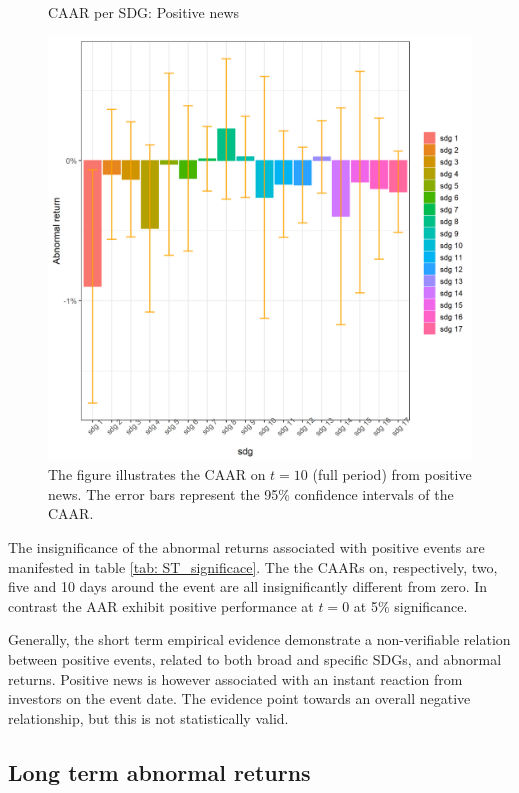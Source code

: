 \begin{figure} [H]
    \centering
    \caption{CAAR per SDG: Positive news}
    \includegraphics[scale=0.6]{Projekt/1.Figures analysis/ST_positive_sdg_bar.png}
    \caption*{\footnotesize The figure illustrates the CAAR on $t = 10$ (full period) from positive news. The error bars represent the 95\% confidence intervals of the CAAR.}
    \label{fig:ST_pos_bar}
\end{figure}

The insignificance of the abnormal returns associated with positive events are manifested in table \ref{tab: ST_significace}. The the CAARs on, respectively, two, five and 10 days around the event are all insignificantly different from zero. In contrast the AAR exhibit positive performance at $t = 0$ at 5\% significance. 

Generally, the short term empirical evidence demonstrate a non-verifiable relation between positive events, related to both broad and specific SDGs, and abnormal returns. Positive news is however associated with an instant reaction from investors on the event date. The evidence point towards an overall negative relationship, but this is not statistically valid.  


\subsection{Long term abnormal returns}



